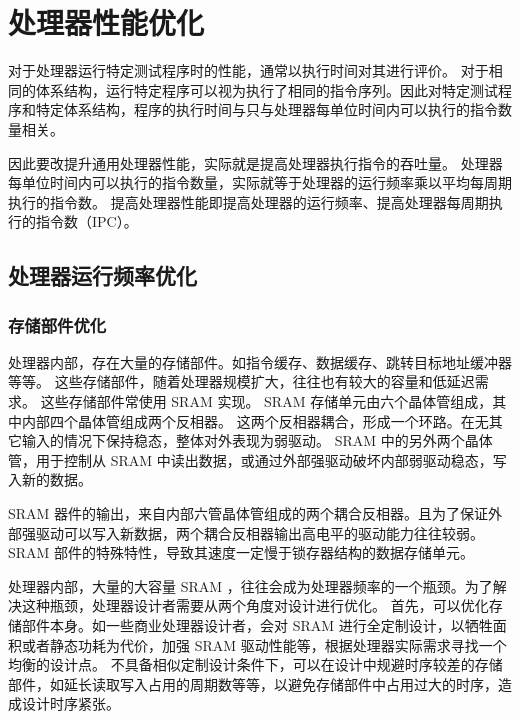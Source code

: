 
\chapter{处理器性能优化}\label{chap:11-advanced-cpu}

对于处理器运行特定测试程序时的性能，通常以执行时间对其进行评价。
对于相同的体系结构，运行特定程序可以视为执行了相同的指令序列。因此对特定测试程序和特定体系结构，程序的执行时间与只与处理器每单位时间内可以执行的指令数量相关。

因此要改提升通用处理器性能，实际就是提高处理器执行指令的吞吐量。
处理器每单位时间内可以执行的指令数量，实际就等于处理器的运行频率乘以平均每周期执行的指令数。
提高处理器性能即提高处理器的运行频率、提高处理器每周期执行的指令数（IPC）。

\section{处理器运行频率优化}\label{sec:11-advanced-cpu-001}

\subsection{存储部件优化}\label{sec:11-advanced-cpu-002}

处理器内部，存在大量的存储部件。如指令缓存、数据缓存、跳转目标地址缓冲器等等。
这些存储部件，随着处理器规模扩大，往往也有较大的容量和低延迟需求。
这些存储部件常使用 SRAM 实现。 SRAM 存储单元由六个晶体管组成，其中内部四个晶体管组成两个反相器。
这两个反相器耦合，形成一个环路。在无其它输入的情况下保持稳态，整体对外表现为弱驱动。
SRAM 中的另外两个晶体管，用于控制从 SRAM 中读出数据，或通过外部强驱动破坏内部弱驱动稳态，写入新的数据。

SRAM 器件的输出，来自内部六管晶体管组成的两个耦合反相器。且为了保证外部强驱动可以写入新数据，两个耦合反相器输出高电平的驱动能力往往较弱。
SRAM 部件的特殊特性，导致其速度一定慢于锁存器结构的数据存储单元。

处理器内部，大量的大容量 SRAM ，往往会成为处理器频率的一个瓶颈。为了解决这种瓶颈，处理器设计者需要从两个角度对设计进行优化。
首先，可以优化存储部件本身。如一些商业处理器设计者，会对 SRAM 进行全定制设计，以牺牲面积或者静态功耗为代价，加强 SRAM 驱动性能等，根据处理器实际需求寻找一个均衡的设计点。
不具备相似定制设计条件下，可以在设计中规避时序较差的存储部件，如延长读取写入占用的周期数等等，以避免存储部件中占用过大的时序，造成设计时序紧张。

